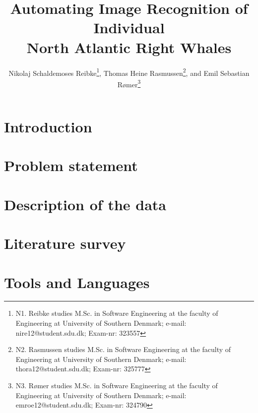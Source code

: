 \documentclass[10pt,a4paper,twocolumn]{article}
\begin{document}
\title{\textbf{Automating Image Recognition of Individual \\ North Atlantic Right Whales}}

\author{Nikolaj Schaldemoses Reibke\thanks{N1. Reibke studies M.Sc. in Software Engineering at the faculty of Engineering at University of Southern Denmark; e-mail: nire12@student.sdu.dk; Exam-nr: 323557},
		Thomas Heine Rasmussen\thanks{N2. Rasmussen studies M.Sc. in Software Engineering at the faculty of Engineering at University of Southern Denmark; e-mail: thora12@student.sdu.dk; Exam-nr: 325777},
        and Emil Sebastian R{\o}mer\thanks{N3. R{\o}mer studies M.Sc. in Software Engineering at the faculty of Engineering at University of Southern Denmark; e-mail: emroe12@student.sdu.dk; Exam-nr: 324790}
}

\maketitle

\begin{abstract}

\end{abstract}

\section{Introduction}


\section{Problem statement}
\label{sec:problem-statement}


\section{Description of the data}
\label{sec:descr-of-data}


\section{Literature survey}


\section{Tools and Languages}

\end{document}
